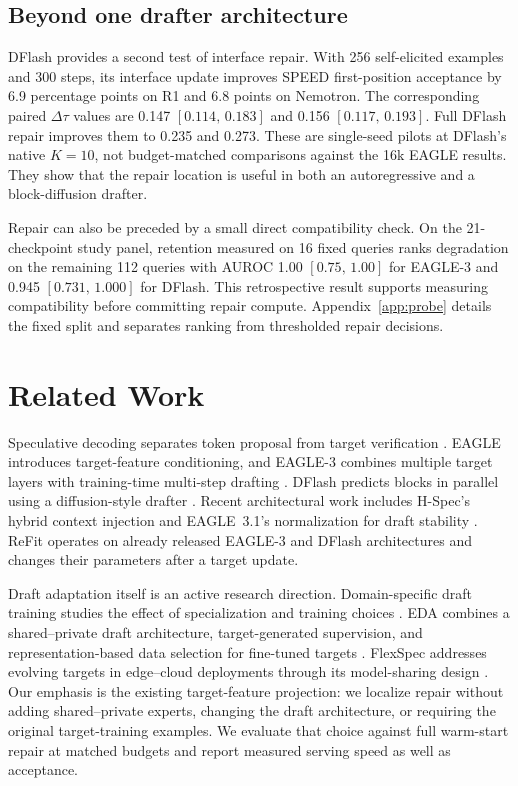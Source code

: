 \documentclass[11pt]{article}
\newcommand{\method}{ReFit}
\newcommand{\ci}[2]{[#1,\,#2]}
\begin{document}
\subsection{Beyond one drafter architecture}
DFlash provides a second test of interface repair. With 256 self-elicited examples and 300 steps, its interface update improves SPEED first-position acceptance by 6.9 percentage points on R1 and 6.8 points on Nemotron. The corresponding paired $\Delta\tau$ values are 0.147 $\ci{0.114}{0.183}$ and 0.156 $\ci{0.117}{0.193}$. Full DFlash repair improves them to 0.235 and 0.273. These are single-seed pilots at DFlash's native $K=10$, not budget-matched comparisons against the 16k EAGLE results. They show that the repair location is useful in both an autoregressive and a block-diffusion drafter.

Repair can also be preceded by a small direct compatibility check. On the 21-checkpoint study panel, retention measured on 16 fixed queries ranks degradation on the remaining 112 queries with AUROC 1.00 $\ci{0.75}{1.00}$ for EAGLE-3 and 0.945 $\ci{0.731}{1.000}$ for DFlash. This retrospective result supports measuring compatibility before committing repair compute. Appendix~\ref{app:probe} details the fixed split and separates ranking from thresholded repair decisions.

\section{Related Work}
Speculative decoding separates token proposal from target verification \citep{leviathan2023,chen2023}. EAGLE introduces target-feature conditioning, and EAGLE-3 combines multiple target layers with training-time multi-step drafting \citep{eagle2024,eagle32025}. DFlash predicts blocks in parallel using a diffusion-style drafter \citep{dflash2026}. Recent architectural work includes H-Spec's hybrid context injection and EAGLE~3.1's normalization for draft stability \citep{hspec2026,eagle312026}. \method{} operates on already released EAGLE-3 and DFlash architectures and changes their parameters after a target update.

Draft adaptation itself is an active research direction. Domain-specific draft training studies the effect of specialization and training choices \citep{domain2025}. EDA combines a shared--private draft architecture, target-generated supervision, and representation-based data selection for fine-tuned targets \citep{eda2026}. FlexSpec addresses evolving targets in edge--cloud deployments through its model-sharing design \citep{flexspec2026}. Our emphasis is the existing target-feature projection: we localize repair without adding shared--private experts, changing the draft architecture, or requiring the original target-training examples. We evaluate that choice against full warm-start repair at matched budgets and report measured serving speed as well as acceptance.
\end{document}

